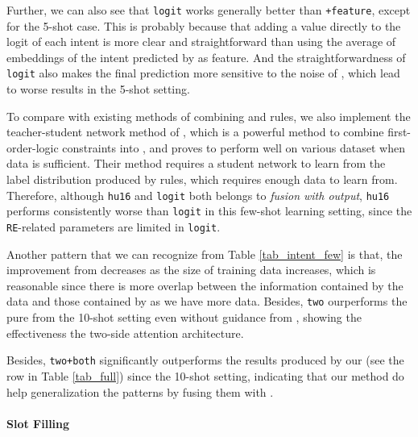 Further, we can also see that \texttt{logit} works generally better than \texttt{+feature}, except for the 5-shot case. This is probably because that adding a value directly to the logit of each intent is more clear and straightforward than using the average of embeddings of the intent predicted by \RE as feature. And the straightforwardness of \texttt{logit} also makes the final prediction more sensitive to the noise of \RE, which lead to worse results in the 5-shot setting.

To compare with existing methods of combining \NN and rules, we also implement the teacher-student network method of \cite{liu2016attention}, which is a powerful method to combine first-order-logic constraints into \NN, and proves to perform well on various dataset when data is sufficient. Their method requires a student network to learn from the label distribution produced by rules, which requires enough data to learn from. Therefore, although \texttt{hu16} and \texttt{logit} both belongs to \emph{fusion with output}, \texttt{hu16} performs consistently worse than \texttt{logit} in this few-shot learning setting, since the \texttt{RE}-related parameters are limited in \texttt{logit}.

Another pattern that we can recognize from Table \ref{tab_intent_few} is that, the improvement from \RE decreases as the size of training data increases, which is reasonable since there is more overlap between the information contained by the data and those contained by \RE as we have more data. Besides, \texttt{two} ourperforms the pure \BLSTM from the 10-shot setting even without guidance from \RE, showing the effectiveness the two-side attention architecture.

Besides, \texttt{two+both} significantly outperforms the results produced by our \RE (see the \RE row in Table \ref{tab_full}) since the 10-shot setting, indicating that our method do help generalization the \RE patterns by fusing them with \NN. 


\paragraph{Slot Filling}

